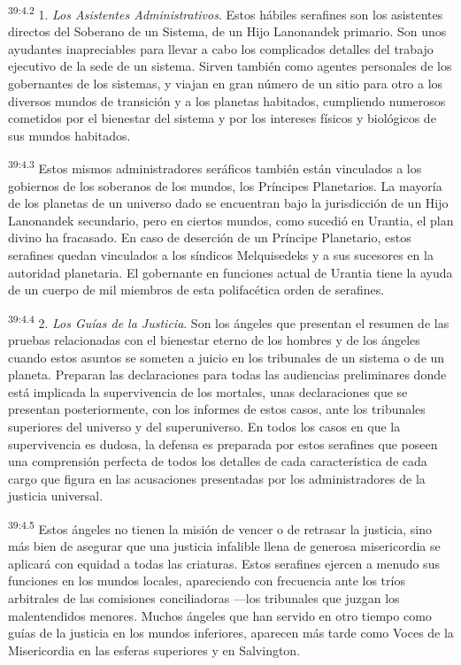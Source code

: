 \par
\textsuperscript{39:4.2} 1. \textit{Los Asistentes Administrativos}. Estos hábiles serafines son los asistentes directos del Soberano de un Sistema, de un Hijo Lanonandek primario. Son unos ayudantes inapreciables para llevar a cabo los complicados detalles del trabajo ejecutivo de la sede de un sistema. Sirven también como agentes personales de los gobernantes de los sistemas, y viajan en gran número de un sitio para otro a los diversos mundos de transición y a los planetas habitados, cumpliendo numerosos cometidos por el bienestar del sistema y por los intereses físicos y biológicos de sus mundos habitados.

\par
\textsuperscript{39:4.3} Estos mismos administradores seráficos también están vinculados a los gobiernos de los soberanos de los mundos, los Príncipes Planetarios. La mayoría de los planetas de un universo dado se encuentran bajo la jurisdicción de un Hijo Lanonandek secundario, pero en ciertos mundos, como sucedió en Urantia, el plan divino ha fracasado. En caso de deserción de un Príncipe Planetario, estos serafines quedan vinculados a los síndicos Melquisedeks y a sus sucesores en la autoridad planetaria. El gobernante en funciones actual de Urantia tiene la ayuda de un cuerpo de mil miembros de esta polifacética orden de serafines.

\par
\textsuperscript{39:4.4} 2. \textit{Los Guías de la Justicia}. Son los ángeles que presentan el resumen de las pruebas relacionadas con el bienestar eterno de los hombres y de los ángeles cuando estos asuntos se someten a juicio en los tribunales de un sistema o de un planeta. Preparan las declaraciones para todas las audiencias preliminares donde está implicada la supervivencia de los mortales, unas declaraciones que se presentan posteriormente, con los informes de estos casos, ante los tribunales superiores del universo y del superuniverso. En todos los casos en que la supervivencia es dudosa, la defensa es preparada por estos serafines que poseen una comprensión perfecta de todos los detalles de cada característica de cada cargo que figura en las acusaciones presentadas por los administradores de la justicia universal.

\par
\textsuperscript{39:4.5} Estos ángeles no tienen la misión de vencer o de retrasar la justicia, sino más bien de asegurar que una justicia infalible llena de generosa misericordia se aplicará con equidad a todas las criaturas. Estos serafines ejercen a menudo sus funciones en los mundos locales, apareciendo con frecuencia ante los tríos arbitrales de las comisiones conciliadoras ---los tribunales que juzgan los malentendidos menores. Muchos ángeles que han servido en otro tiempo como guías de la justicia en los mundos inferiores, aparecen más tarde como Voces de la Misericordia en las esferas superiores y en Salvington.

